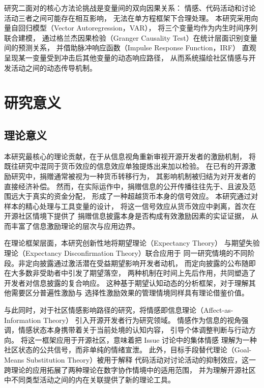 \documentclass[
    type = master, %
    degree = professional,        %
    decl-page,  %
    twoside,                %
    fontset = fandol %
  ]{njuthesis}
\begin{document}
研究二面对的核心方法论挑战是变量间的双向因果关系：
情感、代码活动和讨论活动三者之间可能存在相互影响，
无法在单方程框架下合理处理。
本研究采用向量自回归模型（Vector Autoregression，VAR），
将三个变量均作为内生时间序列联合建模，
通过格兰杰因果检验（Granger Causality Test）在统计层面识别变量间的预测关系，
并借助脉冲响应函数（Impulse Response Function，IRF）
直观呈现某一变量受到冲击后其他变量的动态响应路径，
从而系统描绘社区情感与开发活动之间的动态传导机制。

\section{研究意义}

\subsection{理论意义}

本研究最核心的理论贡献，在于从信息视角重新审视开源开发者的激励机制，
将既往研究中混同于货币效应的信息效应单独提炼出来加以检验。
在已有的开源激励研究中，捐赠通常被视为一种货币转移行为，
其影响机制被归结为对开发者的直接经济补偿\cite{zhang2022who,wang2022influence}。
然而，在实际运作中，捐赠信息的公开传播往往先于、且波及范围远大于真实的资金分配，
形成了一种超越货币本身的信号效应。
本研究通过对样本的精心处理与工具变量的设计，
将这一信号效应从货币效应中剥离，首次在开源社区情境下提供了
捐赠信息披露本身是否构成有效激励因素的实证证据，
从而丰富了信息激励理论的层次与应用边界。

在理论框架层面，本研究创新性地将期望理论（Expectancy Theory）
与期望失验理论（Expectancy Disconfirmation Theory）联合应用于
同一研究情境的不同阶段。非定向披露通过激活潜在受益期望影响开发者动机，
而定向披露的公布随即在大多数非受助者中引发了期望落空，
两种机制在时间上先后作用，共同塑造了开发者对信息披露的复合响应。
这种基于期望认知动态的分析框架，对于理解其他需要区分普遍性激励与
选择性激励效果的管理情境同样具有理论借鉴价值。

与此同时，对于社区情感影响路径的研究，将情感即信息理论（Affect-as-Information Theory）
引入开源开发者行为研究领域。
情感作为信息的视角强调，情感状态本身携带着关于当前处境的认知内容，
引导个体调整判断与行动方向\cite{schwarz1983moods}。
将这一框架应用于开源社区，意味着把 Issue 讨论中的集体情感
理解为一种社区状态的公共信号，而非单纯的情绪宣泄。
此外，目标手段替代理论（Goal-Means Substitution Theory）被用于解释
代码活动对讨论活动的抑制效应，这一跨理论的应用拓展了两种理论在数字协作情境中的适用范围，
并为理解开源社区中不同类型活动之间的内在关联提供了新的理论工具。
\end{document}

